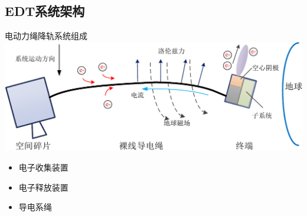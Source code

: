 \documentclass[sectioncirclenumberstyle]{le2iutbmbeamer}
\begin{document}
\subsection{EDT系统架构}
\begin{frame}{电动力绳降轨系统组成}
\includegraphics[width=\linewidth]{figures/deorbitdemo}
\begin{itemize}
\item 电子收集装置
\item 电子释放装置
\item 导电系绳
\end{itemize}
\end{frame}
\end{document}
